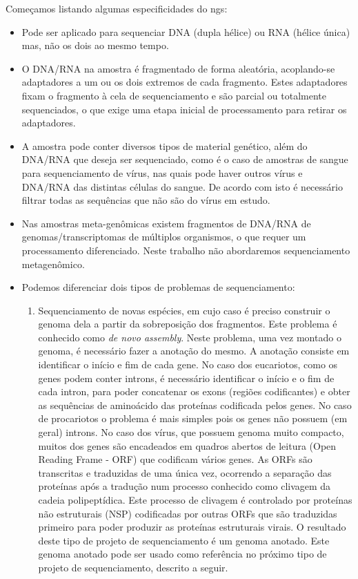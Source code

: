 \documentclass[12pt]{article}
\begin{document}
Começamos listando algumas especificidades do \gls{ngs}:
\begin{itemize}
    \item Pode ser aplicado para sequenciar DNA (dupla hélice) ou RNA (hélice única) mas, não os dois ao mesmo tempo.
    \item O DNA/RNA na amostra é fragmentado de forma aleatória, acoplando-se adaptadores a um ou os dois extremos de cada fragmento. Estes adaptadores fixam o fragmento à cela de sequenciamento e são parcial ou totalmente sequenciados, o que exige uma etapa inicial de processamento para retirar os adaptadores.
    \item A amostra pode conter diversos tipos de material genético, além do DNA/RNA que deseja ser sequenciado, como é o caso de amostras de sangue para sequenciamento de vírus, nas quais pode haver outros vírus e DNA/RNA das distintas células do sangue. De acordo com isto é necessário filtrar todas as sequências que não são do vírus em estudo.
    \item Nas amostras meta-genômicas existem fragmentos de DNA/RNA de genomas/transcriptomas de múltiplos organismos, o que requer um processamento diferenciado. Neste trabalho não abordaremos sequenciamento metagenômico.
    \item Podemos diferenciar dois tipos de problemas de sequenciamento: 
    \begin{enumerate}
        \item Sequenciamento de novas espécies, em cujo caso é preciso construir o genoma dela a partir da sobreposição dos fragmentos. Este problema é conhecido como {\it{de novo assembly}}. Neste problema, uma vez montado o genoma, é necessário fazer a anotação do mesmo. A anotação consiste em identificar o início e fim de cada gene. No caso dos eucariotos, como os genes podem conter introns, é necessário identificar o início e o fim de cada intron, para poder concatenar os exons (regiões codificantes) e obter as sequências de aminoácido das proteínas codificada pelos genes. No caso de procariotos o problema é mais simples pois os genes não possuem (em geral) introns. No caso dos vírus, que possuem genoma muito compacto, muitos dos genes são encadeados em quadros abertos de leitura (Open Reading Frame - ORF) que codificam vários genes. As ORFs são transcritas e traduzidas de uma única vez, ocorrendo a separação das proteínas após a tradução num processo conhecido como clivagem da cadeia polipeptídica. Este processo de clivagem é controlado por proteínas não estruturais (NSP) codificadas por outras ORFs que são traduzidas primeiro para poder produzir as proteínas estruturais virais. O resultado deste tipo de projeto de sequenciamento é um genoma anotado. Este genoma anotado pode ser usado como referência no próximo tipo de projeto de sequenciamento, descrito a seguir.
        

\end{enumerate}
\end{itemize}
\end{document}
